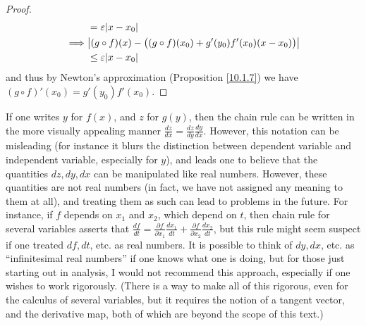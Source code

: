 \begin{proof}
\begin{align*}
                 & = \varepsilon \abs*{x - x_0}                                                                                                                \\
        \implies & \abs*{(g \circ f)(x) - \big((g \circ f)(x_0) + g'(y_0) f'(x_0) (x - x_0)\big)}                                                              \\
                 & \leq \varepsilon \abs*{x - x_0}
    \end{align*}
    and thus by Newton's approximation (Proposition \ref{10.1.7}) we have \((g \circ f)'(x_0) = g'(y_0) f'(x_0)\).
\end{proof}

\begin{remark}\label{10.1.17}
    If one writes \(y\) for \(f(x)\), and \(z\) for \(g(y)\), then the chain rule can be written in the more visually appealing manner \(\frac{dz}{dx} = \frac{dz}{dy} \frac{dy}{dx}\).
    However, this notation can be misleading (for instance it blurs the distinction between dependent variable and independent variable, especially for \(y\)), and leads one to believe that the quantities \(dz, dy, dx\) can be manipulated like real numbers.
    However, these quantities are not real numbers (in fact, we have not assigned any meaning to them at all), and treating them as such can lead to problems in the future.
    For instance, if \(f\) depends on \(x_1\) and \(x_2\), which depend on \(t\), then chain rule for several variables asserts that \(\frac{df}{dt} = \frac{\partial f}{\partial x_1} \frac{dx_1}{dt} + \frac{\partial f}{\partial x_2} \frac{dx_2}{dt}\), but this rule might seem suspect if one treated \(df, dt\), etc. as real numbers.
    It is possible to think of \(dy, dx\), etc. as ``infinitesimal real numbers'' if one knows what one is doing, but for those just starting out in analysis, I would not recommend this approach, especially if one wishes to work rigorously.
    (There is a way to make all of this rigorous, even for the calculus of several variables, but it requires the notion of a tangent vector, and the derivative map, both of which are beyond the scope of this text.)
\end{remark}